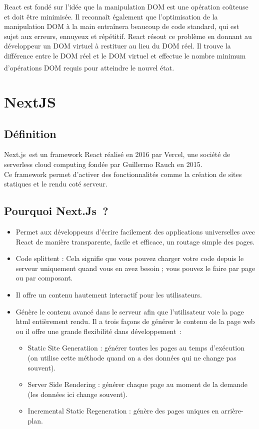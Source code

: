 \documentclass[12pt]{report}
\begin{document}
\vspace*{0.2in}
\hspace*{0.16in}
React est fondé sur l’idée que la manipulation DOM est une opération coûteuse et doit être minimisée. Il reconnaît également que l’optimisation de la manipulation DOM à la main entraînera beaucoup de code standard, qui est sujet aux erreurs, ennuyeux et répétitif. React résout ce problème en donnant au développeur un DOM virtuel à restituer au lieu du DOM réel. Il trouve la différence entre le DOM réel et le DOM virtuel et effectue le nombre minimum d’opérations DOM requis pour atteindre le nouvel état. \textsuperscript{\cite{vipul2016reactjs}}

\section{NextJS}
\subsection{Définition}
\vspace{0.1in}
\hspace*{0.16in}
Next.js est un framework React réalisé en 2016 par Vercel, une société de serverless cloud computing fondée par Guillermo Rauch en 2015.
\\
Ce framework permet d’activer des fonctionnalités comme la création de sites statiques et le rendu coté serveur.

\subsection{Pourquoi Next.Js ?}
\vspace{0.1in}
\begin{itemize}
    \item Permet aux développeurs d'écrire facilement des applications universelles avec React de manière transparente, facile et efficace, un routage simple des pages.
    \item Code splittent : Cela signifie que vous pouvez charger votre code depuis le serveur uniquement quand vous en avez besoin ; vous pouvez le faire par page ou par composant.
    \item Il offre un contenu hautement interactif pour les utilisateurs.
    \item Génère le contenu avancé dans le serveur afin que l'utilisateur voie la page html entièrement rendu. Il a trois façons de générer le contenu de la page web ou il offre une grande flexibilité dans développement :
    \begin{itemize}
        \item Static Site Generatiion : générer toutes les pages au temps d’exécution (on utilise cette méthode quand on a des données qui ne change pas souvent).
        \item Server Side Rendering : générer chaque page au moment de la demande (les données ici change souvent).
        \item Incremental Static Regeneration : génère des pages uniques en arrière-plan.
    \end{itemize}
\end{itemize}
\end{document}
